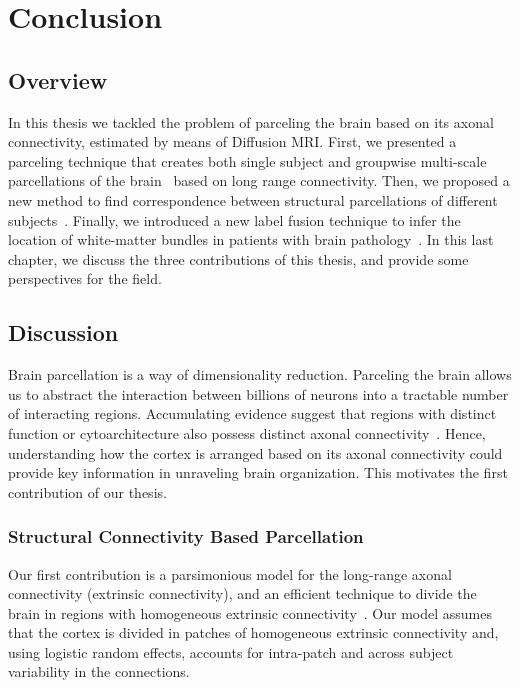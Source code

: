 \chapter{Conclusion}

\section{Overview}
In this thesis we tackled the problem of parceling the brain based on its axonal
connectivity, estimated by means of Diffusion MRI. First, we presented a parceling
technique that creates both single subject and groupwise multi-scale parcellations
of the brain~\cite{Gallardo2017a} based on long range connectivity. Then, we proposed
a new method to find correspondence between structural parcellations of different 
subjects~\cite{Gallardo2018}. Finally, we introduced a new label fusion technique
to infer the location of  white-matter bundles in patients with brain pathology~\cite{Guillermo2018}.
In this last chapter, we discuss the three contributions of this thesis,
and provide some perspectives for the field.

\section{Discussion}
Brain parcellation is a way of dimensionality reduction. Parceling the brain
allows us to abstract the interaction between billions of neurons into a tractable
number of interacting regions. Accumulating evidence suggest that regions with
distinct function or cytoarchitecture also possess distinct axonal connectivity~\citep{Passingham2002, Johansen-Berg2004, Honey2009, Eickhoff2010}.
Hence, understanding how the cortex is arranged based on its axonal connectivity
could provide key information in unraveling brain organization. This motivates
the first contribution of our thesis.

\subsection{Structural Connectivity Based Parcellation}
Our first contribution is a parsimonious model for the long-range axonal
connectivity (extrinsic connectivity), and an efficient technique to divide the
brain in regions with homogeneous extrinsic connectivity~\cite{Gallardo2017a}.
Our model assumes that the cortex is divided in patches of homogeneous extrinsic
connectivity and, using logistic random effects, accounts for intra-patch and
across subject variability in the connections.

